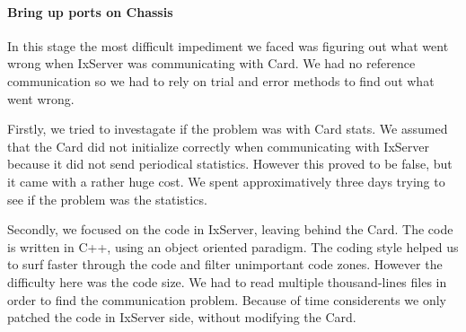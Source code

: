 \paragraph{Bring up ports on Chassis}

In this stage the most difficult impediment we faced was figuring out what went
wrong when IxServer was communicating with Card. We had no reference
communication so we had to rely on trial and error methods to find out what went
wrong.

Firstly, we tried to investagate if the problem was with Card stats. We assumed
that the Card did not initialize correctly when communicating with IxServer
because it did not send periodical statistics. However this proved to be false,
but it came with a rather huge cost. We spent approximatively three days trying
to see if the problem was the statistics.

Secondly, we focused on the code in IxServer, leaving behind the Card. The code
is written in C++, using an object oriented paradigm. The coding style helped us
to surf faster through the code and filter unimportant code zones. However the
difficulty here was the code size. We had to read multiple thousand-lines files
in order to find the communication problem. Because of time considerents we only
patched the code in IxServer side, without modifying the Card.
